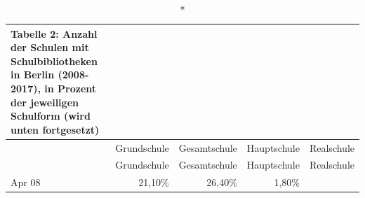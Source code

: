 \documentclass[a4paper,
fontsize=11pt,
oneside,
numbers=noperiodatend,
parskip=half-,
bibliography=totoc,
final
]{scrartcl}
\begin{document}
\begin{longtable}[]{@{}lrrrr@{}}
\caption*{Tabelle 2: Anzahl der Schulen mit Schulbibliotheken in Berlin (2008-2017),
in Prozent der jeweiligen Schulform (wird unten fortgesetzt)}\tabularnewline
\toprule
\begin{minipage}[b]{0.08\columnwidth}\raggedright\strut
\strut
\end{minipage} & \begin{minipage}[b]{0.17\columnwidth}\raggedleft\strut
Grundschule\strut
\end{minipage} & \begin{minipage}[b]{0.18\columnwidth}\raggedleft\strut
Gesamtschule\strut
\end{minipage} & \begin{minipage}[b]{0.17\columnwidth}\raggedleft\strut
Hauptschule\strut
\end{minipage} & \begin{minipage}[b]{0.17\columnwidth}\raggedleft\strut
Realschule\strut
\end{minipage}\tabularnewline
\midrule
\endfirsthead
\toprule
\begin{minipage}[b]{0.08\columnwidth}\raggedright\strut
\strut
\end{minipage} & \begin{minipage}[b]{0.17\columnwidth}\raggedleft\strut
Grundschule\strut
\end{minipage} & \begin{minipage}[b]{0.18\columnwidth}\raggedleft\strut
Gesamtschule\strut
\end{minipage} & \begin{minipage}[b]{0.17\columnwidth}\raggedleft\strut
Hauptschule\strut
\end{minipage} & \begin{minipage}[b]{0.17\columnwidth}\raggedleft\strut
Realschule\strut
\end{minipage}\tabularnewline
\midrule
\endhead
\begin{minipage}[t]{0.08\columnwidth}\raggedright\strut
Apr 08\strut
\end{minipage} & \begin{minipage}[t]{0.17\columnwidth}\raggedleft\strut
21,10\%\strut
\end{minipage} & \begin{minipage}[t]{0.18\columnwidth}\raggedleft\strut
26,40\%\strut
\end{minipage} & \begin{minipage}[t]{0.17\columnwidth}\raggedleft\strut
1,80\%\strut

\end{minipage}
\end{longtable}
\end{document}
